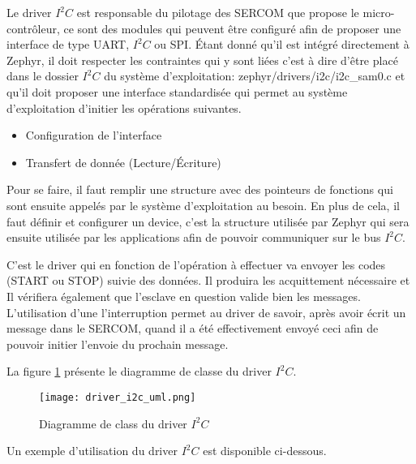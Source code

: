 Le driver $I^{2}C$ est responsable du pilotage des SERCOM que propose le micro-contrôleur, ce sont des modules qui peuvent être configuré afin de proposer une interface de type UART, $I^{2}C$ ou SPI. Étant donné qu'il est intégré directement à Zephyr, il doit respecter les contraintes qui y sont liées c'est à dire d'être placé dans le dossier $I^{2}C$ du système d'exploitation: zephyr/drivers/i2c/i2c\_sam0.c et qu'il doit proposer une interface standardisée qui permet au système d'exploitation d'initier les opérations suivantes.

\begin{itemize}
\item Configuration de l'interface
\item Transfert de donnée (Lecture/Écriture)
\end{itemize}

Pour se faire, il faut remplir une structure avec des pointeurs de fonctions qui sont ensuite appelés par le système d'exploitation au besoin. En plus de cela, il faut définir et configurer un device, c'est la structure utilisée par Zephyr qui sera ensuite utilisée par les applications afin de pouvoir communiquer sur le bus $I^{2}C$.

C'est le driver qui en fonction de l'opération à effectuer va envoyer les codes (START ou STOP) suivie des données. Il produira les acquittement nécessaire et Il vérifiera également que l'esclave en question valide bien les messages. L'utilisation d'une l'interruption permet au driver de savoir, après avoir écrit un message dans le SERCOM, quand il a été effectivement envoyé ceci afin de pouvoir initier l'envoie du prochain message.

La figure \ref{fig:driver_i2c_uml} présente le diagramme de classe du driver $I^{2}C$.

\begin{figure}[htb]
\centering 
\texttt{[image: driver\_i2c\_uml.png]} 
\caption{Diagramme de class du driver $I^{2}C$}
\label{fig:driver_i2c_uml}
\end{figure}

Un exemple d'utilisation du driver $I^{2}C$ est disponible ci-dessous.

